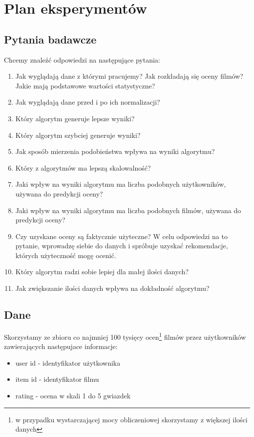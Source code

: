 \documentclass[12pt, a4paper]{article}
\begin{document}
\section{Plan eksperymentów}

\subsection{Pytania badawcze}
Chcemy znaleźć odpowiedzi na następujące pytania:

\begin{enumerate}
\item Jak wyglądają dane z którymi pracujemy? Jak rozkładają się oceny filmów? Jakie mają podstawowe wartości statystyczne?
\item Jak wyglądają dane przed i po ich normalizacji?
\item Który algorytm generuje lepsze wyniki?
\item Który algorytm szybciej generuje wyniki?
\item Jak sposób mierzenia podobieństwa wpływa na wyniki algorytmu?
\item Który z algorytmów ma lepszą skalowalność?
\item Jaki wpływ na wyniki algorytmu ma liczba podobnych użytkowników, używana do predykcji oceny?
\item Jaki wpływ na wyniki algorytmu ma liczba podobnych filmów, używana do predykcji oceny?
\item Czy uzyskane oceny są faktycznie użyteczne? W celu odpowiedzi na to pytanie, wprowadzę siebie do danych i spróbuje uzyskać rekomendacje, których użyteczność mogę ocenić.
\item Który algorytm radzi sobie lepiej dla małej ilości danych?
\item Jak zwiększanie ilości danych wpływa na dokładność algorytmu?
\end{enumerate}

\subsection{Dane}
Skorzystamy ze zbioru co najmniej 100 tysięcy ocen\footnote{w przypadku wystarczającej mocy
obliczeniowej skorzystamy z większej ilości danych} filmów przez użytkowników zawierających
następujace informacje:

\begin{itemize}
\item user id - identyfikator użytkownika
\item item id - identyfikator filmu
\item rating - ocena w skali 1 do 5 gwiazdek
\end{itemize}
\end{document}
